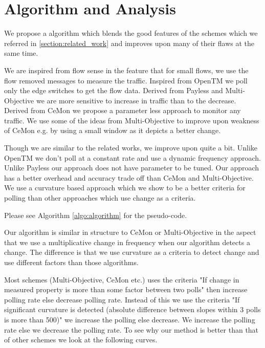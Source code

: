 \section{Algorithm and Analysis}

We propose a algorithm which blends the good features of the schemes which we referred in \ref{section:related_work} and improves upon many of their flaws at the same time. 

We are inspired from flow sense\cite{flowsense} in the feature that for small flows, we use the flow removed messages to measure the traffic. 
Inspired from OpenTM we poll only the edge switches to get the flow data. 
Derived from Payless and Multi-Objective we are more sensitive to increase in traffic than to the decrease.
Derived from CeMon we propose a parameter less approach to monitor any traffic.
We use some of the ideas from Multi-Objective to improve upon weakness of CeMon e.g. by using a small window as it depicts a better change.

Though we are similar to the related works, we improve upon quite a bit.
Unlike OpenTM we don't poll at a constant rate and use a dynamic frequency approach.
Unlike Payless our approach does not have parameter to be tuned.
Our approach has a better overhead and accuracy trade off than CeMon and Multi-Objective.
We use a curvature based approach which we show to be a better criteria for polling than other approaches which use change as a criteria.


Please see Algorithm \ref{algo:algorithm} for the pseudo-code.

Our algorithm is similar in structure to CeMon or Multi-Objective in the aspect that we use a multiplicative change in frequency when our algorithm detects a change.
The difference is that we use curvature as a criteria to detect change and use different factors than those algorithms.

Most schemes (Multi-Objective, CeMon etc.) uses the criteria "If change in measured property is more than some factor between two polls" then increase polling rate else decrease polling rate.
Instead of this we use the criteria "If significant curvature is detected (absolute difference between slopes within 3 polls is more than 500)" we increase the polling else decrease.
We increase the polling rate else we decrease the polling rate.
To see why our method is better than that of other schemes we look at the following curves.


